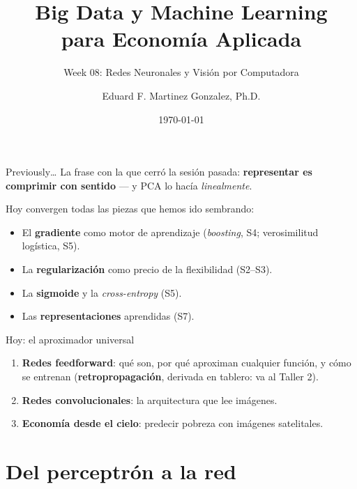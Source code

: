 \documentclass{beamer}
\title[BDML]{Big Data y Machine Learning \\ para Economía Aplicada}
\subtitle{Week 08: Redes Neuronales y Visión por Computadora}
\author{Eduard F. Martinez Gonzalez, Ph.D.}
\institute[]{Departamento de Economía, Universidad Icesi}
\date{\today}
\newcommand{\1}{\mathbb{I}}
\begin{document}
\begin{frame}
\titlepage
\end{frame}

\begin{frame}{Previously\ldots}
\small
La frase con la que cerró la sesión pasada: \textbf{representar es comprimir con sentido} --- y PCA lo hacía \emph{linealmente}.
\pause

\vspace{0.15cm}
Hoy convergen todas las piezas que hemos ido sembrando:
\begin{itemize}\itemsep4pt
  \item El \textbf{gradiente} como motor de aprendizaje (\emph{boosting}, S4; verosimilitud logística, S5).
  \item La \textbf{regularización} como precio de la flexibilidad (S2--S3).
  \item La \textbf{sigmoide} y la \emph{cross-entropy} (S5).
  \item Las \textbf{representaciones} aprendidas (S7).
\end{itemize}
\pause

\vspace{0.15cm}
\begin{block}{Hoy: el aproximador universal}
\begin{enumerate}\itemsep2pt
  \item \textbf{Redes feedforward}: qué son, por qué aproximan cualquier función, y cómo se entrenan (\textbf{retropropagación}, derivada en tablero: va al Taller 2).
  \item \textbf{Redes convolucionales}: la arquitectura que lee imágenes.
  \item \textbf{Economía desde el cielo}: predecir pobreza con imágenes satelitales.
\end{enumerate}
\end{block}
\end{frame}


\section{Del perceptrón a la red}
\begin{frame}[noframenumbering]
\tableofcontents[currentsection]
\end{frame}
\end{document}
